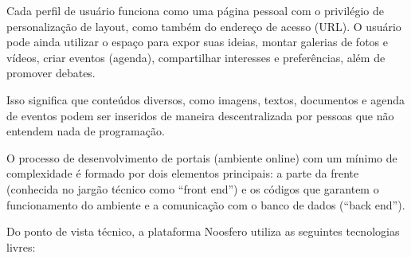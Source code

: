 \documentclass{article}
\begin{document}
Cada perfil de usuário funciona como uma página pessoal com o privilégio de
personalização de layout, como também do endereço de acesso (URL). O usuário
pode ainda utilizar o espaço para expor suas ideias, montar galerias de fotos e
vídeos, criar eventos (agenda), compartilhar interesses e preferências, além de
promover debates.

Isso significa que conteúdos diversos, como imagens, textos, documentos e
agenda de eventos podem ser inseridos de maneira descentralizada por pessoas
que não entendem nada de programação.

O processo de desenvolvimento de portais (ambiente online) com um mínimo de
complexidade é formado por dois elementos principais: a parte da frente
(conhecida no jargão técnico como ``front end'') e os códigos que garantem o
funcionamento do ambiente e a comunicação com o banco de dados (``back end'').

Do ponto de vista técnico, a plataforma Noosfero utiliza as seguintes
tecnologias livres:
\end{document}
